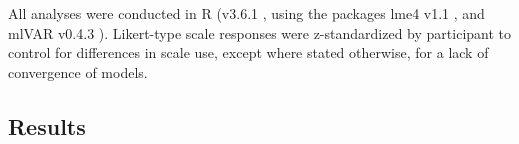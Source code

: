 \documentclass[a4paper,man, natbib,floatsintext]{apa6} %
\begin{document}
All analyses were conducted in R (v3.6.1 \citep{R}, using the packages lme4 v1.1 \citep{Bates2015}, and mlVAR v0.4.3 \citep{Epskamp2019}). Likert-type scale responses were z-standardized by participant to control for differences in scale use, except where stated otherwise, for a lack of convergence of models.


\subsection{Results}
\end{document}
